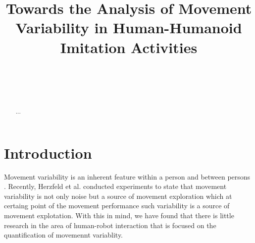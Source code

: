 \documentclass{sigchi}
\def\plaintitle{Towards the Analysis of Movement Variability in Human-Humanoid Imitation Activities}
\def\plainkeywords{Authors' choice; of terms; separated; by
  semicolons; include commas, within terms only; required.}
\begin{document}
\title{\plaintitle}

\author{%
  \\
  \\
  \\
}

\maketitle

\begin{abstract}
  ...
\end{abstract}




\section{Introduction}

Movement variability is an inherent feature within a person and between persons
\cite{newell1993variability}. Recently, Herzfeld et al. \cite{Herzfeld2014}
conducted experiments to state that movement variability is not only noise but a
source of movement exploration which at certaing point of the movement performance
such variability is a source of movement explotation.
With this in mind, we have found that there is little research in the area of
human-robot interaction that is focused on the quantification of movemennt variablity.


%
%
\end{document}
